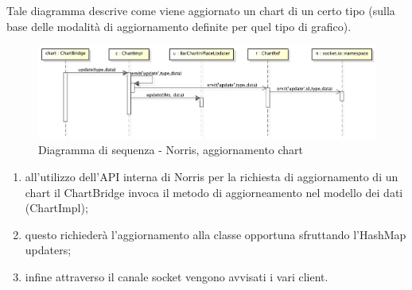            Tale diagramma descrive come viene aggiornato un chart di un certo tipo (sulla base delle modalità di aggiornamento definite per quel tipo di grafico).
            \begin{figure}[H]
                \centering
                \includegraphics[scale=0.3]{DefinizioneDiProdotto/Pics/NorrisAggiornamentoChart}
                \caption{Diagramma di sequenza - Norris, aggiornamento chart}
            \end{figure}
            \begin{enumerate}
                \item all'utilizzo dell'API interna di Norris per la richiesta di aggiornamento di un chart il ChartBridge invoca il metodo di aggiorneamento nel modello dei dati (ChartImpl);
                \item questo richiederà l'aggiornamento alla classe opportuna sfruttando l'HashMap updaters;
                \item infine attraverso il canale socket vengono avvisati i vari client.
            \end{enumerate}
